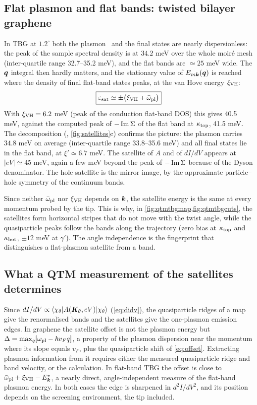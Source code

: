 \subsection{Flat plasmon and flat bands: twisted bilayer graphene}
\label{sec:flatsat}

In TBG at $1.2^\circ$ both the plasmon~\cite{Lewandowski2019,Wei2025} and the final states are nearly dispersionless: the peak of the sample
spectral density is at $34.2$ meV over the whole moir\'e mesh (inter-quartile range 32.7--35.2 meV), and the flat bands
are $\simeq25$ meV wide. The $\bm q$ integral then hardly matters, and the stationary value of $E_{m\bm k}(\bm q)$ is reached
where the density of final flat-band states peaks, at the van Hove energy $\xi_{\rm VH}$:
\begin{equation}
\boxed{\varepsilon_{\rm sat}\simeq\pm\bigl(\xi_{\rm VH}+\bar\omega_{\rm pl}\bigr)}
\label{eq:flatsat}
\end{equation}
With $\xi_{\rm VH}=6.2$ meV (peak of the conduction flat-band DOS) this gives 40.5 meV, against the computed peak of
$-\operatorname{Im}\Sigma$ of the flat band at $\kappa_{\rm top}$, 41.5 meV. The decomposition (,
\cref{fig:satellites}c) confirms the picture: the plasmon carries $34.8$ meV on average (inter-quartile range
33.8--35.6 meV) and all final states lie in the flat band, at $\xi'\simeq6.7$ meV. The satellite of $A$ and of
$dI/dV$ appears at $|eV|\simeq45$ meV, again a few meV beyond the peak of $-\operatorname{Im}\Sigma$ because of the Dyson
denominator. The hole satellite is the mirror image, by the approximate particle--hole symmetry of the
continuum bands.

Since neither $\bar\omega_{\rm pl}$ nor $\xi_{\rm VH}$ depends on $\bm k$, the satellite energy is the same at every momentum
probed by the tip. This is why, in \cref{fig:qtmtbgmap,fig:qtmtbgcuts}, the satellites form horizontal stripes
that do not move with the twist angle, while the quasiparticle peaks follow the bands along the trajectory
(zero bias at $\kappa_{\rm top}$ and $\kappa_{\rm bot}$, $\pm12$ meV at $\gamma'$). The angle independence is the
fingerprint that distinguishes a flat-plasmon satellite from a band.

\subsection{What a QTM measurement of the satellites determines}

Since $dI/dV\propto\langle \chi_\theta|A(\bm K_\theta,eV)|\chi_\theta\rangle$ (\cref{eq:didv}), the quasiparticle ridges of a map give the
renormalised bands and the satellites give the one-plasmon emission edges. In graphene the satellite
offset is not the plasmon energy but $\Delta=\max_q[\omega_{\rm pl}-\hbar v_Fq]$, a property of the plasmon dispersion
near the momentum where its slope equals $v_F$, plus the quasiparticle shift of \cref{eq:offset}. Extracting
plasmon information from it requires either the measured quasiparticle ridge and band velocity, or the
calculation. In flat-band TBG the offset is close to $\bar\omega_{\rm pl}+\xi_{\rm VH}-E^*_{\bm k}$, a nearly direct, angle-independent
measure of the flat-band plasmon energy. In both cases the edge is sharpened in $d^2I/dV^2$, and its position
depends on the screening environment, the tip included.
